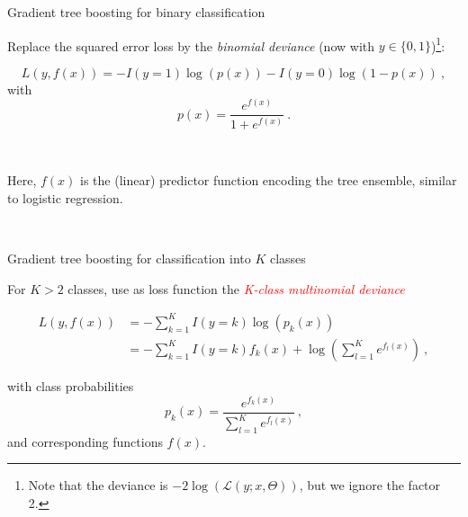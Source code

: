 \documentclass[
  10pt,
  ignorenonframetext,
]{beamer}
\begin{document}
\begin{frame}
\begin{block}{Gradient tree boosting for binary classification}
\label{gradient-tree-boosting-for-binary-classification}
\(~\)

Replace the squared error loss by the \emph{binomial deviance} (now with
\(y\in \{0,1\}\))\footnote{Note that the deviance is $-2\log(\mathcal{L}(y;x,\Theta))$, but we ignore the factor 2.}:

\[L(y,f(x)) = -I(y=1) \log(p(x)) - I(y=0) \log(1-p(x)) \ , \] with
\[p(x) = \frac{e^{f(x)}}{1+e^{f(x)}} \ .\]

\(~\)

Here, \(f(x)\) is the (linear) predictor function encoding the tree
ensemble, similar to logistic regression.

\(~\)
\end{block}
\end{frame}

\begin{frame}
\begin{block}{Gradient tree boosting for classification into \(K\)
classes}
\label{gradient-tree-boosting-for-classification-into-k-classes}
\(~\)

For \(K>2\) classes, use as loss function the
\emph{\textcolor{red}{K-class multinomial deviance}}

\begin{align}
L(y,f(x)) &= -\sum_{k=1}^K I(y = k) \log (p_k(x)) \\ 
 & = -\sum_{k=1}^K I(y = k) f_k(x) + \log(\sum_{l=1}^K e^{f_l(x)}) \ ,
 \end{align}

with class probabilities
\[p_k(x) = \frac{e^{f_k(x)}}{\sum_{l=1}^K e^{f_l(x)}} \ , \] and
corresponding functions \(f(x)\).
\end{block}
\end{frame}
\end{document}
